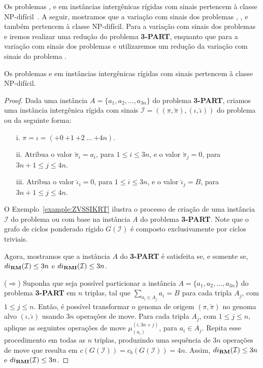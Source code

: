 Os problemas \SbIR{}, \SbIRT{} e \SbIRTM{} em instâncias intergênicas rígidas com sinais pertencem à classe NP-difícil~\cite{2021a-oliveira-etal,2021b-oliveira-etal}. A seguir, mostramos que a variação com sinais dos problemas \SbIRM{}, \SbIRMI{}, \SbIRTI{} e \SbIRTMI{} também pertencem à classe NP-difícil. Para a variação com sinais dos problemas \SbIRM{} e \SbIRMI{} iremos realizar uma redução do problema \textbf{3-PART}, enquanto que para a variação com sinais dos problemas \SbIRTI{} e \SbIRTMI{} utilizaremos um redução da variação com sinais do problema \SbRT{}.

\begin{theorem}\label{theorem:FETVDCDT}
Os problemas \SbIRM{} e \SbIRMI{} em instâncias intergênicas rígidas com sinais pertencem à classe NP-difícil.
\end{theorem}
\begin{proof}
Dada uma instância $A=\{a_1,a_2,\dots,a_{3n}\}$ do problema \textbf{3-PART}, criamos uma instância intergênica rígida com sinais $\mathcal{I} = ((\pi,\breve\pi ),(\iota,\breve\iota))$ do problema \SbIRM{} ou \SbIRMI{} da seguinte forma:
\begin{itemize}
    \item[i.] $\pi = \iota = ({+0}~{+1}~{+2}~\dots~{+4n})$.
    \item[ii.] Atribua o valor $\breve\pi_i = a_i$, para $1 \le i \le 3n$, e o valor $\breve\pi_j = 0$, para $3n+1 \le j \le 4n$.
    \item[iii.] Atribua o valor $\breve\iota_i = 0$, para $1 \le i \le 3n$, e o valor $\breve\iota_j = B$, para $3n+1 \le j \le 4n$.
\end{itemize}

O Exemplo~\ref{example:ZVSSIKRT} ilustra o processo de criação de uma instância $\mathcal{I}$ do problema \SbIRM{} ou \SbIRMI{} com base na instância $A$ do problema \textbf{3-PART}. Note que o grafo de ciclos ponderado rígido $G(\mathcal{I})$ é composto exclusivamente por ciclos triviais.



Agora, mostramos que a instância $A$ do \textbf{3-PART} é satisfeita se, e somente se, \break$di_{\textbf{RM}}(\mathcal{I}) \le 3n$ e $di_{\textbf{RMI}}(\mathcal{I}) \le 3n$.

($\Rightarrow$) Suponha que seja possível particionar a instância $A=\{a_1,a_2,\dots,a_{3n}\}$ do problema \textbf{3-PART} em $n$ triplas, tal que $\sum_{a_i \in A_j} a_i = B$ para cada tripla $A_j$, com $1\le j \le n$. Então, é possível transformar o genoma de origem $(\pi, \breve\pi)$ no genoma alvo $(\iota, \breve\iota)$ usando $3n$ operações de move. Para cada tripla $A_j$, com $1\le j \le n$, aplique as seguintes operações de move $\mu_{(a_i)}^{(i,3n+j)}$, para $a_i \in A_j$. Repita esse procedimento em todas as $n$ triplas, produzindo uma sequência de $3n$ operações de move que resulta em $c(G(\mathcal{I})) = c_b(G(\mathcal{I})) = 4n$. Assim, $di_{\textbf{RM}}(\mathcal{I}) \le 3n$ e $di_{\textbf{RMI}}(\mathcal{I}) \le 3n$.


\end{proof}
